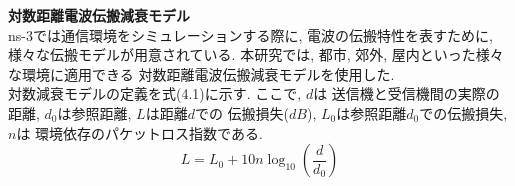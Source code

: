 {\LARGE\textbf{対数距離電波伝搬減衰モデル}}\\[1em]
\indent ns-3では通信環境をシミュレーションする際に, 
電波の伝搬特性を表すために, 様々な伝搬モデルが用意されている. 
本研究では, 都市, 郊外, 屋内といった様々な環境に適用できる
対数距離電波伝搬減衰モデルを使用した.\\ 
\indent 対数減衰モデルの定義を式(4.1)に示す. ここで, $d$は
送信機と受信機間の実際の距離, $d_0$は参照距離, $L$は距離$d$での
伝搬損失($dB$), $L_0$は参照距離$d_0$での伝搬損失, $n$は
環境依存のパケットロス指数である. \\
\begin{equation}
  L = L_0 + 10n\log_{10}\left(\frac{d}{d_0}\right)
\end{equation}